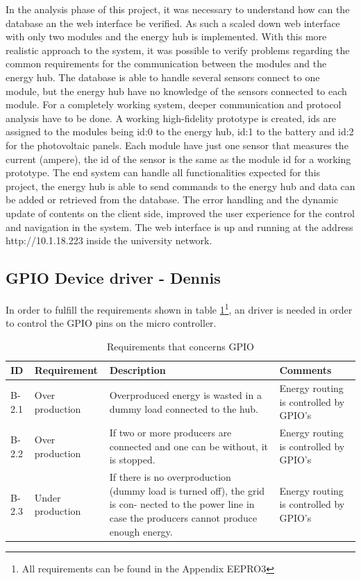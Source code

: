 In the analysis phase of this project, it was necessary to understand how can the database an the web interface be verified. As such a scaled down web interface with only two modules and the energy hub is implemented.
\p
With this more realistic approach to the system, it was possible to verify problems regarding the common requirements for the communication between the modules and the energy hub. The database is able to handle several sensors connect to one module, but the energy hub have no knowledge of the sensors connected to each module. For a completely working system, deeper communication and protocol analysis have to be done.
\p
A working high-fidelity prototype is created, ids are assigned to the modules being id:0 to the energy hub, id:1 to the battery and id:2 for the photovoltaic panels. Each module have just one sensor that measures the current (ampere), the id of the sensor is the same as the module id for a working prototype.
\p
The end system can handle all functionalities expected for this project, the energy hub is able to send commands to the energy hub and data can be added or retrieved from the database. The error handling and the dynamic update of contents on the client side, improved the user experience for the control and navigation in the system.
\p 
The web interface is up and running at the address http://10.1.18.223 inside the university network.
\subsection{GPIO Device driver - Dennis}
In order to fulfill the requirements shown in table \ref{tab:gpio_req}\footnote{All requirements can be found in the Appendix EEPRO3}, an driver is needed in order to control the GPIO pins on the micro controller. 
\begin{table}[H]
\centering
	\begin{tabular}{|p{1.2cm}|p{2.8cm}|p{8cm}|p{3.5cm}|}
	\hline
	ID		& Requirement		& Description												& Comments\\\hline
	B-2.1	& Over production & Overproduced energy is wasted in a dummy load connected to the hub. & Energy routing is controlled by GPIO's \\\hline
	B-2.2	& Over production & If two or more producers are connected and one can be without, it is stopped. & Energy routing is controlled by GPIO's \\\hline
	B-2.3	& Under production & If there is no overproduction (dummy load is turned off), the grid is con- nected to the power line in case the producers cannot produce enough energy. & Energy routing is controlled by GPIO's \\\hline
	\end{tabular}
	\caption{Requirements that concerns GPIO}
	\label{tab:gpio_req}
\end{table}
%
